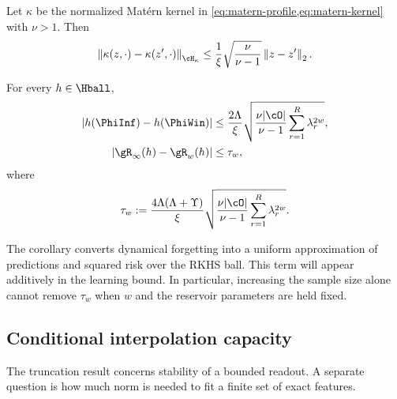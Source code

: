 \begin{lemma}
\label{lem:matern-stability}
Let \(\kappa\) be the normalized Mat\'ern kernel in
\cref{eq:matern-profile,eq:matern-kernel} with \(\nu>1\). Then
\begin{equation}
    \norm{\kappa(z,\cdot)-\kappa(z',\cdot)}_{\cH_\kappa}
    \leq
    \frac1{\xi}\sqrt{\frac{\nu}{\nu-1}}\norm{z-z'}_2.
    \label{eq:matern-section-lipschitz}
\end{equation}
\end{lemma}

\begin{corollary}
\label{cor:loss-truncation}
For every \(h\in\Hball\),
\begin{align}
    \abs{h(\PhiInf)-h(\PhiWin)}
    &\leq
    \frac{2\Lambda}{\xi}
    \sqrt{
      \frac{\nu|\cO|}{\nu-1}
      \sum_{r=1}^R\lambda_r^{2w}
    },
    \label{eq:prediction-truncation}\\
    \abs{\risk_\infty(h)-\risk_w(h)}
    &\leq
    \tau_w,
    \label{eq:risk-truncation}
\end{align}
where
\begin{equation}
    \tau_w
    :=
    \frac{4\Lambda(\Lambda+\Upsilon)}{\xi}
    \sqrt{
      \frac{\nu|\cO|}{\nu-1}
      \sum_{r=1}^R\lambda_r^{2w}
    }.
    \label{eq:tau-window}
\end{equation}
\end{corollary}

The corollary converts dynamical forgetting into a uniform approximation of
predictions and squared risk over the RKHS ball. This term will appear
additively in the learning bound. In particular, increasing the sample size
alone cannot remove \(\tau_w\) when \(w\) and the reservoir parameters are held
fixed.

\subsection{Conditional interpolation capacity}

The truncation result concerns stability of a bounded readout. A separate
question is how much norm is needed to fit a finite set of exact features.

